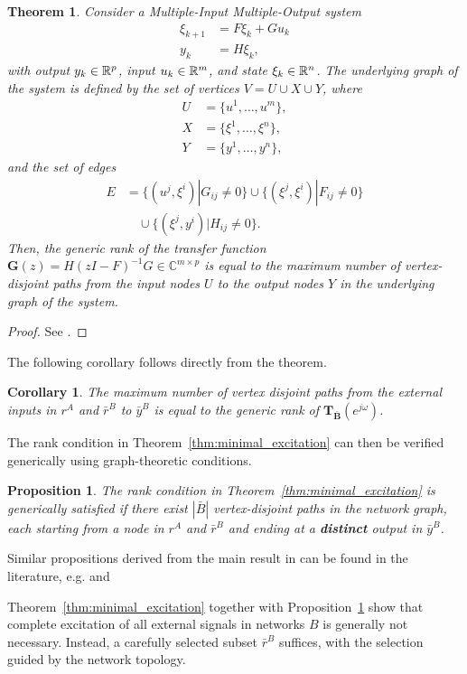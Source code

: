 \documentclass[11pt,a4paper]{article}
\newtheorem{theorem}{Theorem}
\newtheorem{corollary}{Corollary}[theorem]
\newtheorem{proposition}{Proposition}[section]
\begin{document}
\begin{theorem}\label{th:graph_TF_rank}
Consider a Multiple-Input Multiple-Output system
\begin{align*}
    \xi_{k+1} &= F\xi_{k} + Gu_k\\
    y_k &= H\xi_{k},
\end{align*}
with output $y_k\in \mathbb{R}^p$, input $u_k\in \mathbb{R}^m$, and state $\xi_k\in \mathbb{R}^n$. The underlying graph of the system is defined by the set of vertices $V = U\cup X \cup Y$, where
\begin{align*}
    U &= \{u^1, \dots, u^m\}, \\ 
    X &= \{\xi^1, \dots, \xi^n\},\\
    Y &= \{y^1, \dots, y^n\},
\end{align*}
and the set of edges
\begin{align*}
    E &= \{(u^j,\xi^i)|G_{ij}\neq 0\} \cup \{(\xi^j,\xi^i)|F_{ij}\neq 0\}\\ &\quad \cup \{(\xi^j,y^i)|H_{ij}\neq 0\}.
\end{align*}
Then, the generic rank of the transfer function $\mathbf{G}(z) = H(zI - F)^{-1}G \in \mathbb{C}^{m\times p}$ is equal to the maximum number of vertex-disjoint paths from the input nodes $U$ to the output nodes $Y$ in the underlying graph of the system.
\end{theorem}
\begin{proof}
   See \cite[Theorem 2]{graph_TF_rank}. 
\end{proof}

The following corollary follows directly from the theorem.

\begin{corollary}
    The maximum number of vertex disjoint paths from the external inputs in $ r^A$ and $\bar r^B$ to $\bar y^B$ is equal to the generic rank of $\mathbf{T_{\bar B}}(e^{j\omega})$.
\end{corollary}

The rank condition in Theorem~\ref{thm:minimal_excitation} can then be verified generically using graph-theoretic conditions.

\begin{proposition}\label{prop:path_based}
    The rank condition in Theorem~\ref{thm:minimal_excitation} is generically satisfied if there exist $|\bar B|$ vertex-disjoint paths in the network graph, each starting from a node in $r^A$ and $\bar r^B$ and ending at a \textbf{distinct} output in $\bar y^B$.
\end{proposition}

Similar propositions derived from the main result in \cite{graph_TF_rank} can be found in the literature, e.g. \cite[Proposition V.1]{HendrickGeversBazanella2019} and \cite[Proposition 1]{VandenHofRamaswamy2020}

Theorem~\ref{thm:minimal_excitation} together with Proposition~\ref{prop:path_based} show that complete excitation of all external signals in networks $B$ is generally not necessary. Instead, a carefully selected subset $\bar r^B$ suffices, with the selection guided by the network topology.

 
\end{document}
